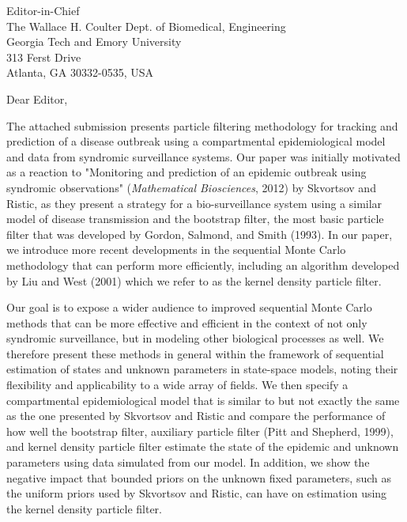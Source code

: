 \documentclass{letter} %
\begin{document}
\signature{Daniel M. Sheinson, Jarad Niemi, and Wendy Meiring}           %
\longindentation=0pt                       %
\let\raggedleft\raggedright                %

\begin{letter}{Editor-in-Chief \\
The Wallace H. Coulter Dept. of Biomedical, Engineering \\
Georgia Tech and Emory University \\
313 Ferst Drive \\
Atlanta, GA 30332-0535, USA
}

\opening{Dear Editor,}

\noindent The attached submission presents particle filtering methodology for tracking and prediction of a disease outbreak using a compartmental epidemiological model and data from syndromic surveillance systems. Our paper was initially motivated as a reaction to "Monitoring and prediction of an epidemic outbreak using syndromic observations" (\emph{Mathematical Biosciences}, 2012) by Skvortsov and Ristic, as they present a strategy for a bio-surveillance system using a similar model of disease transmission and the bootstrap filter, the most basic particle filter that was developed by Gordon, Salmond, and Smith (1993). In our paper, we introduce more recent developments in the sequential Monte Carlo methodology that can perform more efficiently, including an algorithm developed by Liu and West (2001) which we refer to as the kernel density particle filter.

Our goal is to expose a wider audience to improved sequential Monte Carlo methods that can be more effective and efficient in the context of not only syndromic surveillance, but in modeling other biological processes as well. We therefore present these methods in general within the framework of sequential estimation of states and unknown parameters in state-space models, noting their flexibility and applicability to a wide array of fields. We then specify a compartmental epidemiological model that is similar to but not exactly the same as the one presented by Skvortsov and Ristic and compare the performance of how well the bootstrap filter, auxiliary particle filter (Pitt and Shepherd, 1999), and kernel density particle filter estimate the state of the epidemic and unknown parameters using data simulated from our model. In addition, we show the negative impact that bounded priors on the unknown fixed parameters, such as the uniform priors used by Skvortsov and Ristic, can have on estimation using the kernel density particle filter.


\end{letter}
\end{document}
